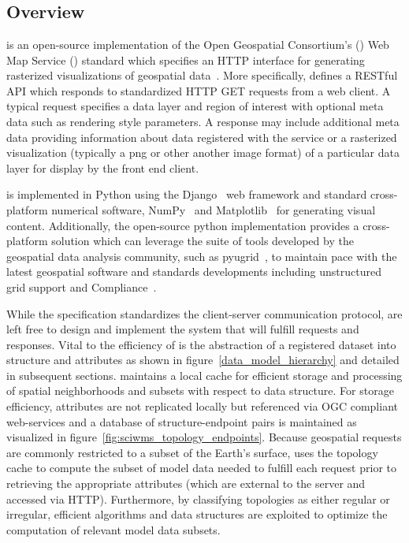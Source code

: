 \section{\sciwms{}}
\label{sec:sciwms}

\subsection{Overview}
\Sciwms{} is an open-source implementation of the Open Geospatial
Consortium's (\ogc{}) Web Map Service (\wms{}) standard which
specifies an HTTP interface for generating rasterized visualizations
of geospatial data~\cite{wms14}. More specifically, \wms{} defines a
RESTful API which responds to standardized HTTP GET requests from a
web client. A typical \wms{} request specifies a data layer and region
of interest with optional meta data such as rendering style
parameters. A \wms{} response may include additional meta data
providing information about data registered with the service or a
rasterized visualization (typically a png or other another image
format) of a particular data layer for display by the front end
client.

\sciwms{} is implemented in Python using the Django~\cite{django} web
framework and standard cross-platform numerical software,
NumPy~\cite{numpy11} and Matplotlib~\cite{hunter07} for generating
visual content. Additionally, the open-source python implementation
provides a cross-platform \wms{} solution which can leverage the suite
of tools developed by the geospatial data analysis community, such as
pyugrid~\cite{pyugrid}, to maintain pace with the latest geospatial
software and standards developments including unstructured grid
support and \cfugrid{} Compliance~\cite{cfugrid}.

While the \ogc{} \wms{} specification standardizes the client-server
communication protocol, \wms{} are left free to design and implement
the system that will fulfill \wms{} requests and responses. Vital to
the efficiency of \sciwms{} is the abstraction of a registered dataset
into structure and attributes as shown in
figure~\ref{data_model_hierarchy} and detailed in subsequent
sections. \Sciwms{} maintains a local cache for efficient storage and
processing of spatial neighborhoods and subsets with respect to data
structure. For storage efficiency, attributes are not replicated
locally but referenced via OGC compliant web-services and a database
of structure-endpoint pairs is maintained as visualized in
figure~\ref{fig:sciwms_topology_endpoints}. Because geospatial \wms{}
requests are commonly restricted to a subset of the Earth's surface,
\sciwms{} uses the topology cache to compute the subset of model data
needed to fulfill each request prior to retrieving the appropriate
attributes (which are external to the \sciwms{} server and accessed via
HTTP). Furthermore, by classifying topologies as either regular or
irregular, efficient algorithms and data structures are exploited to
optimize the computation of relevant model data subsets.

